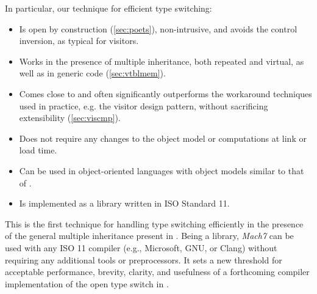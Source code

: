 \noindent
In particular, our technique for efficient type switching:
%
  \begin{itemize}
  \setlength{\itemsep}{0pt}
  \setlength{\parskip}{0pt}
  \item Is open by construction (\textsection\ref{sec:poets}), non-intrusive, 
        and avoids the control inversion, as typical for visitors. 
  \item Works in the presence of multiple inheritance, both repeated and 
        virtual, as well as in generic code (\textsection\ref{sec:vtblmem}).
  \item Comes close to and often significantly outperforms the workaround techniques used in 
        practice, e.g. the visitor design pattern, without sacrificing extensibility
        (\textsection\ref{sec:viscmp}). 
  \item Does not require any changes to the \Cpp{} object model or computations at 
        link or load time. 
  \item Can be used in object-oriented languages with 
        object models similar to that of \Cpp{}.
  \item Is implemented as a library written in ISO Standard \Cpp{}11.
  \end{itemize}

\noindent
This is the first technique for handling type switching efficiently 
in the presence of the general multiple inheritance present in \Cpp{}.
Being a library, \emph{Mach7} can be used with any 
ISO \Cpp{}11 compiler (e.g., Microsoft, GNU, or Clang) without requiring 
any additional tools or preprocessors. It
sets a new threshold for acceptable performance, brevity, clarity, and
usefulness of a forthcoming compiler implementation of the open type switch in \Cpp{}.

